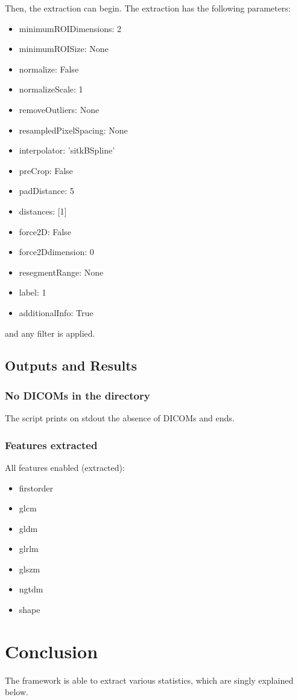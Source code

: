 \documentclass[12pt]{article}
\begin{document}
Then, the extraction can begin.
The extraction has the following parameters:
	\begin{itemize}
		\item minimumROIDimensions: 2
		\item minimumROISize: None
		\item normalize: False
		\item normalizeScale: 1
		\item removeOutliers: None
		\item resampledPixelSpacing: None
		\item interpolator: 'sitkBSpline'
		\item preCrop: False
		\item padDistance: 5
		\item distances: [1]
		\item force2D: False
		\item force2Ddimension: 0
		\item resegmentRange: None
		\item label: 1
		\item additionalInfo: True
	\end{itemize}
and any filter is applied.

	\subsection{Outputs and Results}
	\subsubsection{No DICOMs in the directory}
The script prints on stdout the absence of DICOMs and ends.

	\subsubsection{Features extracted}
All features enabled (extracted):
	\begin{itemize}
		\item firstorder
		\item glcm
		\item gldm
		\item glrlm
		\item glszm
		\item ngtdm
		\item shape
	\end{itemize}

	\pagebreak
	\section{Conclusion}\label{sec:con}
The framework is able to extract various statistics, which are singly explained below.
\end{document}

